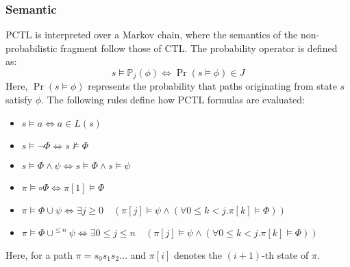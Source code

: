 \subsubsection{Semantic}
PCTL is interpreted over a Markov chain, where the semantics of the non-probabilistic fragment follow those of CTL. 
The probability operator is defined as:
\[s\models\mathbb{P}_j(\phi)\Leftrightarrow\Pr(s\models\phi)\in J\]
Here, $\Pr(s\models\phi)$ represents the probability that paths originating from state $s$ satisfy $\phi$. 
The following rules define how PCTL formulas are evaluated:
\begin{itemize}
    \item $s \models a \Leftrightarrow a \in L(s)$
    \item $s \models \lnot\Phi \Leftrightarrow s \not\models \Phi$
    \item $s \models \Phi \land \psi \Leftrightarrow s \models \Phi \land s \models \psi$
    \item $\pi \models \circ \Phi \Leftrightarrow \pi[1] \models \Phi$
    \item $\pi \models \Phi \cup \psi \Leftrightarrow \exists j \geq 0 \quad(\pi[j] \models \psi \land (\forall 0 \leq k < j. \pi[k] \models \Phi))$
    \item $\pi \models \Phi \cup^{\leq n} \psi \Leftrightarrow \exists 0 \leq j \leq n \quad(\pi[j] \models \psi \land (\forall 0 \leq k < j. \pi[k] \models \Phi))$
\end{itemize}
Here, for a path $\pi = s_0 s_1 s_2 \dots$ and $\pi[i]$ denotes the $(i+1)$-th state of $\pi$.

